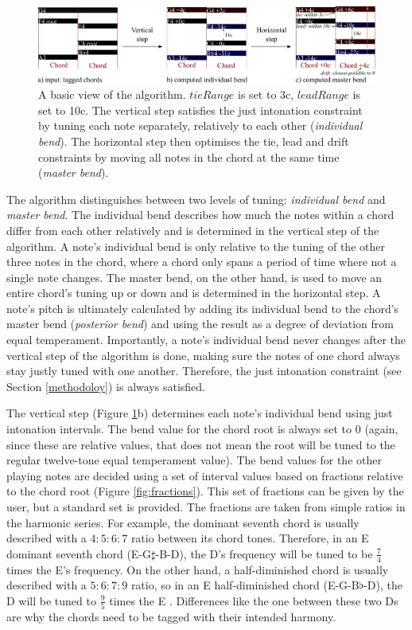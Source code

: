\documentclass[a4paper]{article}
\begin{document}
\begin{figure}
	\includegraphics[width=\linewidth]{Figures/algo_outline.pdf}
	\caption{A basic view of the algorithm. $\mathit{tieRange}$ is set to 3c, $\mathit{leadRange}$ is set to 10c. The vertical step satisfies the just intonation constraint by tuning each note separately, relatively to each other (\textit{individual bend}). The horizontal step then optimises the tie, lead and drift constraints by moving all notes in the chord at the same time (\textit{master bend}).}
	\label{fig:algo_outline}
\end{figure}

The algorithm distinguishes between two levels of tuning: \textit{individual bend} and \textit{master bend}. The individual bend describes how much the notes within a chord differ from each other relatively and is determined in the vertical step of the algorithm. A note's individual bend is only relative to the tuning of the other three notes in the chord, where a chord only spans a period of time where not a single note changes. The master bend, on the other hand, is used to move an entire chord's tuning up or down and is determined in the horizontal step. A note's pitch is ultimately calculated by adding its individual bend to the chord's master bend (\textit{posterior bend}) and using the result as a degree of deviation from equal temperament. Importantly, a note's individual bend never changes after the vertical step of the algorithm is done, making sure the notes of one chord always stay justly tuned with one another. Therefore, the just intonation constraint (see Section \ref{methodoloy}) is always satisfied.

The vertical step (Figure \ref{fig:algo_outline}b) determines each note's individual bend using just intonation intervals. The bend value for the chord root is always set to 0 (again, since these are relative values, that does not mean the root will be tuned to the regular twelve-tone equal temperament value). The bend values for the other playing notes are decided using a set of interval values based on fractions relative to the chord root (Figure \ref{fig:fractions}). This set of fractions can be given by the user, but a standard set is provided. The fractions are taken from simple ratios in the harmonic series. For example, the dominant seventh chord is usually described with a $4:5:6:7$ ratio between its chord tones. Therefore, in an E dominant seventh chord (E-G$\sharp$-B-D), the D's frequency will be tuned to be $\frac74$ times the E's frequency. On the other hand, a half-diminished chord is usually described with a $5:6:7:9$ ratio, so in an E half-diminished chord (E-G-B$\flat$-D), the D will be tuned to $\frac95$ times the E \cite{van_de_craats_fis_1989}. Differences like the one between these two Ds are why the chords need to be tagged with their intended harmony.
\end{document}
